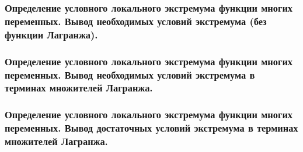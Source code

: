 \documentclass[10pt]{article}
\begin{document}
    \subsubsection{Определение условного локального экстремума функции многих переменных. Вывод необходимых условий экстремума (без функции Лагранжа).}
    \subsubsection{Определение условного локального экстремума функции многих переменных. Вывод необходимых условий экстремума в терминах множителей Лагранжа.}
    \subsubsection{Определение условного локального экстремума функции многих переменных. Вывод достаточных условий экстремума в терминах множителей Лагранжа.}
\end{document}
